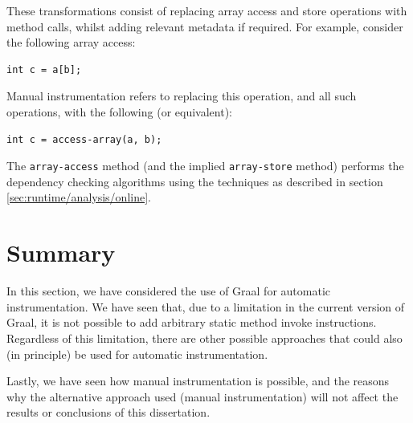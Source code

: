 These transformations consist of replacing array access and store operations with method calls, whilst adding relevant metadata if required. For example, consider the following array access:

\begin{lstlisting}[label=list:array-access,caption=Standard array access in Java]
int c = a[b];\end{lstlisting}

Manual instrumentation refers to replacing this operation, and all such operations, with the following (or equivalent):

\begin{lstlisting}[label=list:instrumented-array-access,caption=Instrumented array access]
int c = access-array(a, b);\end{lstlisting}

The \texttt{array-access} method (and the implied \texttt{array-store} method) performs the dependency checking algorithms using the techniques as described in section \ref{sec:runtime/analysis/online}.
	
\section{Summary} \label{sec:instrumentation/summary}
In this section, we have considered the use of Graal for automatic instrumentation. We have seen that, due to a limitation in the current version of Graal, it is not possible to add arbitrary static method invoke instructions. Regardless of this limitation, there are other possible approaches that could also (in principle) be used for automatic instrumentation.

Lastly, we have seen how manual instrumentation is possible, and the reasons why the alternative approach used (manual instrumentation) will not affect the results or conclusions of this dissertation.